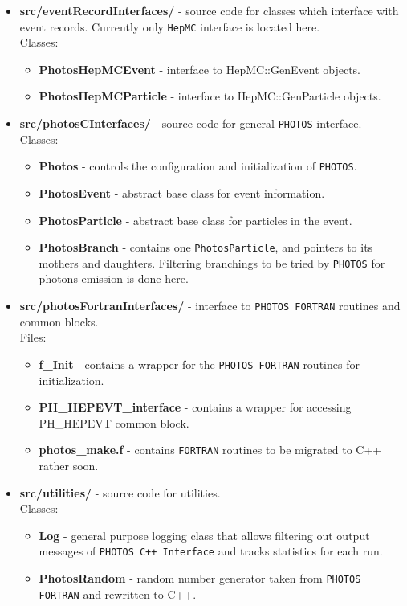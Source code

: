 \documentclass[]{Photos_interface_design}
\begin{document}
\begin{itemize}
\item {\bf src/eventRecordInterfaces/ } - source code for classes which interface with event records.
      Currently only {\tt HepMC} interface is located here.\\
  Classes:
  \begin{itemize}
  \item { \bf PhotosHepMCEvent} - interface to HepMC::GenEvent objects. 
  \item { \bf PhotosHepMCParticle} - interface to HepMC::GenParticle objects. 
  \end{itemize}   

\item {\bf src/photosCInterfaces/ } - source code for general {\tt PHOTOS} interface.  \\
  Classes:
  \begin{itemize}
  \item { \bf Photos } - controls the configuration and initialization of {\tt PHOTOS}.
  \item { \bf PhotosEvent } - abstract base class for event information.
  \item { \bf PhotosParticle } - abstract base class for particles in the event.
  \item { \bf PhotosBranch } - contains one {\tt PhotosParticle}, and  pointers to its mothers and daughters.
  Filtering branchings to be tried by {\tt PHOTOS} for photons emission is done here.
  \end{itemize}

\item {\bf src/photosFortranInterfaces/ } -  interface to {\tt PHOTOS FORTRAN} routines and common blocks. \\
  Files:
    \begin{itemize}
    \item { \bf f\_Init } - contains a wrapper for the {\tt PHOTOS FORTRAN} routines for initialization.
    \item { \bf PH\_HEPEVT\_interface } - contains a wrapper for accessing PH\_HEPEVT common block.
    \item { \bf photos\_make.f } - contains  {\tt FORTRAN} routines to be  migrated to C++ rather soon.
    \end{itemize}

\item {\bf src/utilities/ } - source code for utilities.\\
  Classes:
  \begin{itemize}
  \item { \bf Log} - general purpose logging class that allows filtering out output messages 
      of {\tt PHOTOS C++ Interface} and tracks statistics for each run.
  \item { \bf PhotosRandom} - random number generator taken from {\tt PHOTOS FORTRAN} and rewritten to C++.
  \end{itemize}   


\end{itemize}
\end{document}
